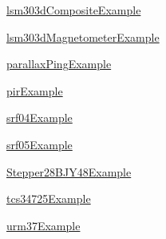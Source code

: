 \begin{DoxyCompactItemize}
\item 
 \hyperlink{namespacelibsensorPy_1_1examples_1_1lsm303dCompositeExample}{lsm303d\+Composite\+Example}
\item 
 \hyperlink{namespacelibsensorPy_1_1examples_1_1lsm303dMagnetometerExample}{lsm303d\+Magnetometer\+Example}
\item 
 \hyperlink{namespacelibsensorPy_1_1examples_1_1parallaxPingExample}{parallax\+Ping\+Example}
\item 
 \hyperlink{namespacelibsensorPy_1_1examples_1_1pirExample}{pir\+Example}
\item 
 \hyperlink{namespacelibsensorPy_1_1examples_1_1srf04Example}{srf04\+Example}
\item 
 \hyperlink{namespacelibsensorPy_1_1examples_1_1srf05Example}{srf05\+Example}
\item 
 \hyperlink{namespacelibsensorPy_1_1examples_1_1Stepper28BJY48Example}{Stepper28\+B\+J\+Y48\+Example}
\item 
 \hyperlink{namespacelibsensorPy_1_1examples_1_1tcs34725Example}{tcs34725\+Example}
\item 
 \hyperlink{namespacelibsensorPy_1_1examples_1_1urm37Example}{urm37\+Example}
\end{DoxyCompactItemize}
